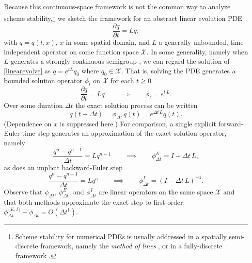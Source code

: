 \documentclass[letterpaper,final,12pt,reqno]{amsart}
\begin{document}
Because this continuous-space framework is not the common way to analyze scheme stability,\footnote{Scheme stability for numerical PDEs is usually addressed in a spatially semi-discrete framework, namely the \emph{method of lines} \cite{LeVeque2007}, or in a fully-discrete framework \cite{MortonMayers2005}.} we sketch the framework for an abstract linear evolution PDE
\begin{equation}
\frac{\partial q}{\partial t} = L q, \label{linearevolve}
\end{equation}
with $q=q(t,x)$, $x$ in some spatial domain, and $L$ a generally-unbounded, time-independent operator on some function space $\mathcal{X}$.  In some generality, namely when $L$ generates a strongly-continuous semigroup \cite{Evans2010}, we can regard the solution of \eqref{linearevolve} as $q = e^{tL} q_0$ where $q_0 \in \mathcal{X}$.  That is, solving the PDE generates a bounded solution operator $\phi_t$ on $\mathcal{X}$ for each $t\ge 0$
\begin{equation}
\frac{\partial q}{\partial t} = L q \qquad \implies \qquad \phi_t = e^{t\,L}. \label{linearexact}
\end{equation}
Over some duration $\Delta t$ the exact solution process can be written
    $$q(t+\Delta t) = \phi_{\Delta t}\, q(t) = e^{\Delta t\,L} q(t).$$
(Dependence on $x$ is suppressed here.)  For comparison, a single explicit forward-Euler time-step generates an approximation of the exact solution operator, namely
\begin{equation}
\frac{q^{n}-q^{n-1}}{\Delta t} = L q^{n-1} \qquad \implies \qquad \phi^E_{\Delta t} = I + \Delta t\,L, \label{linearexplicit}
\end{equation}
as does an implicit backward-Euler step
\begin{equation}
\frac{q^{n}-q^{n-1}}{\Delta t} = L q^{n} \qquad \implies \qquad \phi^I_{\Delta t} = (I - \Delta t\,L)^{-1}. \label{linearimplicit}
\end{equation}
Observe that $\phi_{\Delta t}$, $\phi^E_{\Delta t}$, and $\phi^I_{\Delta t}$ are linear operators on the same space $\mathcal{X}$ and that both methods approximate the exact step to first order: $\phi^{\{E,I\}}_{\Delta t} - \phi_{\Delta t} = O(\Delta t^1)$.
\end{document}
